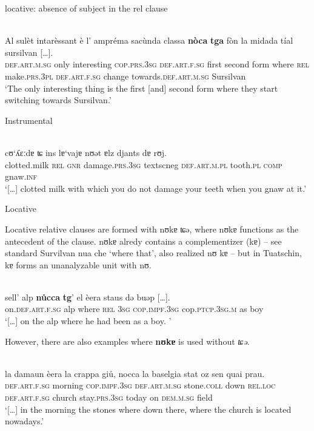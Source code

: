 {locative: absence of subject in the rel clause

\ea\label{}
\\
\gll    Al sulèt intarèssant è l’ ampréma sacùnda classa \textbf{nòca} \textbf{tga} fòn la midada tíal sursilvan […].\\
     \textsc{def.art.m.sg} only interesting \textsc{cop.prs.3sg} \textsc{def.art.f.sg} first second form where \textsc{rel} make.\textsc{prs.3pl} \textsc{def.art.f.sg} change towards.\textsc{def.art.m.sg} Sursilvan\\
\glt `The only interesting thing is the first [and] second form where they start switching  towards Sursilvan.'
\z
   

Instrumental


\ea\label{}
 {\citealt[8f.]{Valär2013b}}\\
\gll    […] cʊ‘ʎɛːdɐ ʨ ins lɐ‘vajɐ nʊǝt ɐlz djants dɐ rʊj. \\
     […] clotted.milk \textsc{rel} \textsc{gnr} damage.\textsc{prs.3sg} textsc{neg} \textsc{def.art.m.pl} tooth.\textsc{pl} \textsc{comp} gnaw.\textsc{inf} \\
\glt `[…] clotted milk with which you do not damage your teeth when you gnaw at it.'
\z

Locative

Locative relative clauses are formed with nʊkɐ ʨǝ, where nʊkɐ functions as the antecedent of the clause. nʊkɐ alredy contains a complementizer (kɐ) –  see standard Survilvan nua che ‘where that’, also realized nʊ kɐ – but in Tuatschin, kɐ forms an unanalyzable unit with nʊ.

\ea\label{}
\\
\gll   […] sell’ alp \textbf{nůcca} \textbf{tg}’ el èera staus dǝ buǝp […]. \\
     […]  on.\textsc{def.art.f.sg} alp where \textsc{rel} \textsc{3sg} \textsc{cop.impf.3sg} cop.\textsc{ptcp.3sg.m} as boy\\
\glt `[…] on the alp where he had been as a boy. '
\z

However, there are also examples where \textbf{nʊkɐ} is used without \textit{ʨə}.

\ea\label{}
\\
\gll    […] la damaun èera la crappa giů, nocca la baselgia stat oz sen quai prau.\\
     […] \textsc{def.art.f.sg} morning \textsc{cop.impf.3sg} \textsc{def.art.m.sg} stone.\textsc{coll} down \textsc{rel.loc} \textsc{def.art.f.sg} church stay.\textsc{prs.3sg} today on \textsc{dem.m.sg} field\\
\glt `[…] in the morning the stones where down there, where the church is located nowadays.'
\z

}
